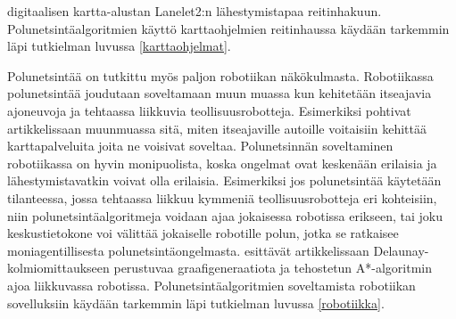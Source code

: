 digitaalisen kartta-alustan Lanelet2:n lähestymistapaa reitinhakuun. 
Polunetsintäalgoritmien käyttö karttaohjelmien reitinhaussa käydään tarkemmin 
läpi tutkielman luvussa \ref{karttaohjelmat}. \par
	Polunetsintää on tutkittu myös paljon robotiikan näkökulmasta. 
Robotiikassa polunetsintää joudutaan soveltamaan muun muassa kun 
kehitetään itseajavia ajoneuvoja ja tehtaassa liikkuvia 
teollisuusrobotteja.\cite{arXivMAPF} Esimerkiksi \textcite{Lanelet2} 
pohtivat artikkelissaan muunmuassa sitä, miten itseajaville autoille 
voitaisiin kehittää karttapalveluita joita ne voisivat soveltaa. 
Polunetsinnän soveltaminen robotiikassa on hyvin monipuolista, koska 
ongelmat ovat keskenään erilaisia ja lähestymistavatkin voivat olla 
erilaisia. Esimerkiksi jos polunetsintää käytetään tilanteessa, jossa 
tehtaassa liikkuu kymmeniä teollisuusrobotteja eri kohteisiin, niin 
polunetsintäalgoritmeja voidaan ajaa jokaisessa robotissa erikseen, tai 
joku keskustietokone voi välittää jokaiselle robotille polun, jotka se 
ratkaisee moniagentillisesta polunetsintäongelmasta. 
\textcite{DelaunayVoronoiAStar} esittävät artikkelissaan 
Delaunay-kolmiomittaukseen perustuvaa graafigeneraatiota ja tehostetun 
A*-algoritmin ajoa liikkuvassa robotissa. Polunetsintäalgoritmien 
soveltamista robotiikan sovelluksiin käydään tarkemmin läpi tutkielman 
luvussa \ref{robotiikka}.
